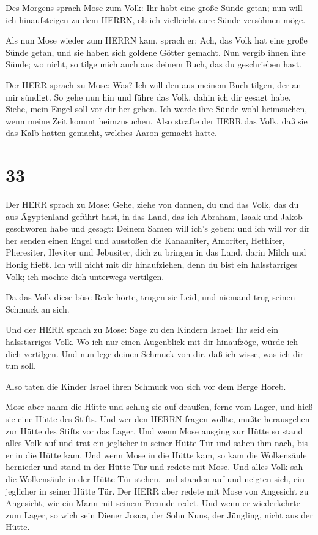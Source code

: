  Des Morgens sprach Mose zum Volk: Ihr habt eine große
Sünde getan; nun will ich hinaufsteigen zu dem HERRN, ob ich vielleicht
eure Sünde versöhnen möge.

 Als nun Mose wieder zum HERRN kam, sprach er: Ach, das
Volk hat eine große Sünde getan, und sie haben sich goldene Götter
gemacht.  Nun vergib ihnen ihre Sünde; wo nicht, so tilge
mich auch aus deinem Buch, das du geschrieben hast.

 Der HERR sprach zu Mose: Was? Ich will den aus meinem Buch
tilgen, der an mir sündigt.  So gehe nun hin und führe das
Volk, dahin ich dir gesagt habe. Siehe, mein Engel soll vor dir her
gehen. Ich werde ihre Sünde wohl heimsuchen, wenn meine Zeit kommt
heimzusuchen.  Also strafte der HERR das Volk, daß sie das
Kalb hatten gemacht, welches Aaron gemacht hatte.

\hypertarget{section-32}{%
\section{33}\label{section-32}}

 Der HERR sprach zu Mose: Gehe, ziehe von dannen, du und das
Volk, das du aus Ägyptenland geführt hast, in das Land, das ich Abraham,
Isaak und Jakob geschworen habe und gesagt: Deinem Samen will ich's
geben;  und ich will vor dir her senden einen Engel und
ausstoßen die Kanaaniter, Amoriter, Hethiter, Pheresiter, Heviter und
Jebusiter,  dich zu bringen in das Land, darin Milch und
Honig fließt. Ich will nicht mit dir hinaufziehen, denn du bist ein
halsstarriges Volk; ich möchte dich unterwegs vertilgen.

 Da das Volk diese böse Rede hörte, trugen sie Leid, und
niemand trug seinen Schmuck an sich.

 Und der HERR sprach zu Mose: Sage zu den Kindern Israel:
Ihr seid ein halsstarriges Volk. Wo ich nur einen Augenblick mit dir
hinaufzöge, würde ich dich vertilgen. Und nun lege deinen Schmuck von
dir, daß ich wisse, was ich dir tun soll.

 Also taten die Kinder Israel ihren Schmuck von sich vor dem
Berge Horeb.

 Mose aber nahm die Hütte und schlug sie auf draußen, ferne
vom Lager, und hieß sie eine Hütte des Stifts. Und wer den HERRN fragen
wollte, mußte herausgehen zur Hütte des Stifts vor das Lager.
 Und wenn Mose ausging zur Hütte so stand alles Volk auf und
trat ein jeglicher in seiner Hütte Tür und sahen ihm nach, bis er in die
Hütte kam.  Und wenn Mose in die Hütte kam, so kam die
Wolkensäule hernieder und stand in der Hütte Tür und redete mit Mose.
 Und alles Volk sah die Wolkensäule in der Hütte Tür
stehen, und standen auf und neigten sich, ein jeglicher in seiner Hütte
Tür.  Der HERR aber redete mit Mose von Angesicht zu
Angesicht, wie ein Mann mit seinem Freunde redet. Und wenn er
wiederkehrte zum Lager, so wich sein Diener Josua, der Sohn Nuns, der
Jüngling, nicht aus der Hütte.

